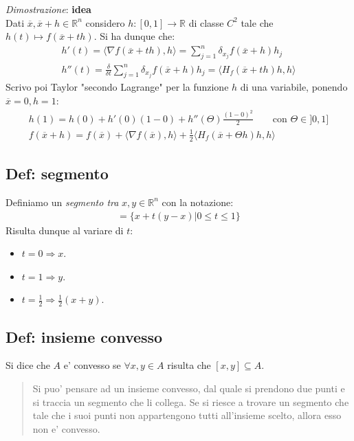 \documentclass{article}
\begin{document}
\noindent \emph{Dimostrazione}: \textbf{idea} \\
Dati $\overline{x}, \overline{x} + h \in \mathbb{R}^n$ considero $h: [0,1] \to \mathbb{R}$
di classe $C^2$ tale che $h(t) \mapsto f(\overline{x} + th)$. Si ha dunque che:
\begin{align*}
  h'(t) = \langle \nabla f(\overline{x} + th), h \rangle = \sum_{j=1}^n \delta_{x_j} f(\overline{x} + h)h_j \\
  h''(t) = \frac{\delta}{\delta t} \sum_{j=1}^n \delta_{x_j} f(\overline{x} + h) h_j = \langle H_f(\overline{x} + th)h, h \rangle
\end{align*}
Scrivo poi Taylor "secondo Lagrange" per la funzione $h$ di una variabile,
ponendo $\overline{x} = 0, h = 1$:
\begin{align*}
  h(1) = h(0) + h'(0)(1-0) + h''(\Theta)\frac{(1-0)^2}{2} \qquad \text{con } \Theta \in ]0,1] \\
  f(\overline{x} +h) = f(\overline{x}) + \langle \nabla f(\overline{x}), h \rangle +
  \frac{1}{2} \langle H_f (\overline{x} + \Theta h) h, h \rangle
\end{align*}

\subsection{Def: segmento}

Definiamo un \emph{segmento tra} $x, y \in \mathbb{R}^n$ con la notazione:
\begin{align*}
  [x,y] = \{x+t(y-x) | 0 \leq t \leq 1\}
\end{align*}
Risulta dunque al variare di $t$:
\begin{itemize}
  \item $t = 0 \Rightarrow x$.
  \item $t = 1 \Rightarrow y$.
  \item $t = \frac{1}{2} \Rightarrow \frac{1}{2}(x + y)$.
\end{itemize}

\subsection{Def: insieme convesso}

Si dice che $A$ e' convesso se $\forall x, y \in A$ risulta che $[x,y] \subseteq A$.

\begin{quote}
  Si puo' pensare ad un insieme convesso, dal quale si prendono due punti e si traccia
  un segmento che li collega. Se si riesce a trovare un segmento che tale che i suoi
  punti non appartengono tutti all'insieme scelto, allora esso non e' convesso.
\end{quote}
\end{document}
